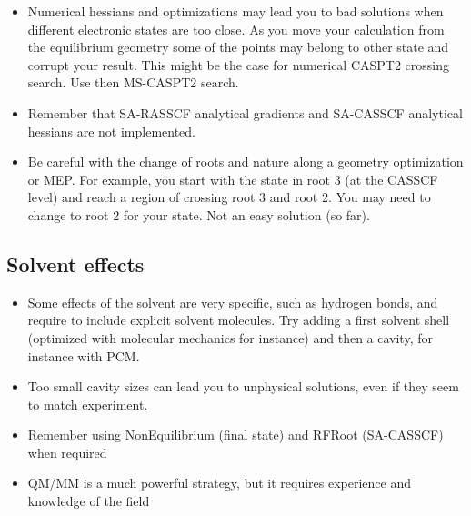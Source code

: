 \begin{itemize}
\item Numerical hessians and optimizations may lead you to bad solutions when different 
electronic states are too close. As you move your calculation from the equilibrium geometry 
some of the points may belong to other state and corrupt your result. This might be the case 
for numerical CASPT2 crossing search. Use then MS-CASPT2 search. 
\item Remember that SA-RASSCF analytical gradients and SA-CASSCF analytical hessians are 
not implemented. 
\item Be careful with the change of roots and nature along a geometry optimization or MEP. 
For example, you start with the state in root 3 (at the CASSCF level) and reach a region 
of crossing root 3 and root 2. You may need to change to root 2 for your state. 
Not an easy solution (so far). 
\end{itemize}


\subsection{Solvent effects}
\begin{itemize}
\item Some effects of the solvent are very specific, such as hydrogen bonds, and require to 
include explicit solvent molecules. Try adding a first solvent shell (optimized with 
molecular mechanics for instance) and then a cavity, for instance with PCM. 
\item Too small cavity sizes can lead you to unphysical solutions, 
even if they seem to match experiment. 
\item Remember using NonEquilibrium (final state) and RFRoot (SA-CASSCF) 
when required 
\item QM/MM is a much powerful strategy, but it requires experience and knowledge 
of the field 
\end{itemize}


